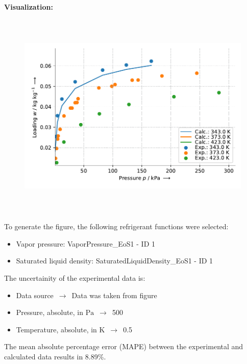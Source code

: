 \textbf{Visualization:}
%
\begin{figure}[!htp]
{\noindent\includegraphics[height=10cm, keepaspectratio]{figs/ads/ads_Propylene_carbon_molecular_sieve_4A_DubininAstakhov_1.pdf}}
\end{figure}
%

To generate the figure, the following refrigerant functions were selected:
\begin{itemize}
\item Vapor pressure: VaporPressure\_EoS1 - ID 1
\item Saturated liquid density: SaturatedLiquidDensity\_EoS1 - ID 1
\end{itemize}

The uncertainity of the experimental data is:
\begin{itemize}
\item Data source $\,\to\,$ Data was taken from figure
\item Pressure, absolute, in $\si{\pascal}$ $\,\to\,$ 500
\item Temperature, absolute, in $\si{\kelvin}$ $\,\to\,$ 0.5
\end{itemize}

The mean absolute percentage error (MAPE) between the experimental and calculated data results in 8.89\%.
\FloatBarrier
\newpage
